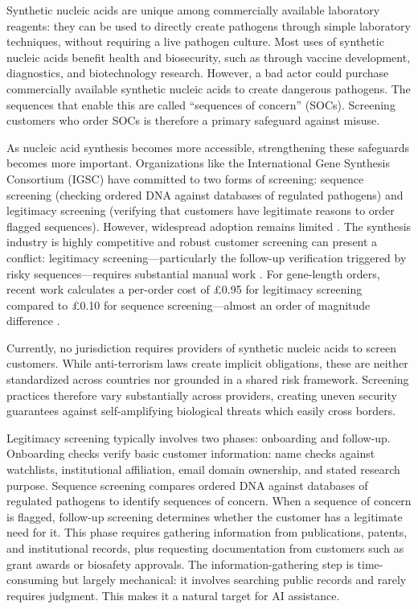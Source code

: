 \documentclass[utf8]{FrontiersinHarvard}
\begin{document}
Synthetic nucleic acids are unique among commercially available laboratory reagents: they can be used to directly create pathogens through simple laboratory techniques, without requiring a live pathogen culture. Most uses of synthetic nucleic acids benefit health and biosecurity, such as through vaccine development, diagnostics, and biotechnology research. However, a bad actor could purchase commercially available synthetic nucleic acids to create dangerous pathogens. The sequences that enable this are called ``sequences of concern'' (SOCs). Screening customers who order SOCs is therefore a primary safeguard against misuse.

As nucleic acid synthesis becomes more accessible, strengthening these safeguards becomes more important. Organizations like the International Gene Synthesis Consortium (IGSC) have committed to two forms of screening: sequence screening (checking ordered DNA against databases of regulated pathogens) and legitimacy screening (verifying that customers have legitimate reasons to order flagged sequences). However, widespread adoption remains limited \citep{Crawford2024}. The synthesis industry is highly competitive and robust customer screening can present a conflict: legitimacy screening---particularly the follow-up verification triggered by risky sequences---requires substantial manual work \citep{CarterFriedman2015, AlexanianCarter2024}. For gene-length orders, recent work calculates a per-order cost of \pounds0.95 for legitimacy screening compared to \pounds0.10 for sequence screening---almost an order of magnitude difference \citep{Fady2025annexes}.

Currently, no jurisdiction requires providers of synthetic nucleic acids to screen customers. While anti-terrorism laws create implicit obligations, these are neither standardized across countries nor grounded in a shared risk framework. Screening practices therefore vary substantially across providers, creating uneven security guarantees against self-amplifying biological threats which easily cross borders.

Legitimacy screening typically involves two phases: onboarding and follow-up. Onboarding checks verify basic customer information: name checks against watchlists, institutional affiliation, email domain ownership, and stated research purpose. Sequence screening compares ordered DNA against databases of regulated pathogens to identify sequences of concern. When a sequence of concern is flagged, follow-up screening determines whether the customer has a legitimate need for it. This phase requires gathering information from publications, patents, and institutional records, plus requesting documentation from customers such as grant awards or biosafety approvals. The information-gathering step is time-consuming but largely mechanical: it involves searching public records and rarely requires judgment. This makes it a natural target for AI assistance.
\end{document}
